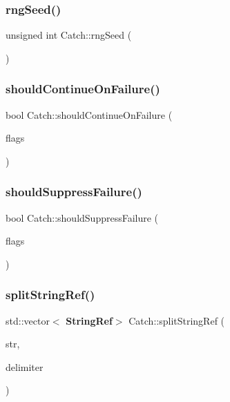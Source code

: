 \mbox{\label{namespace_catch_acf5ea05e942d2d7fe79111e12754ed76}} 
\subsubsection{rngSeed()}
{\footnotesize\ttfamily unsigned int Catch\+::rng\+Seed (\begin{DoxyParamCaption}{ }\end{DoxyParamCaption})}

\mbox{\label{namespace_catch_a7f7480b15d74965459c844f0d393ed87}} 
\subsubsection{shouldContinueOnFailure()}
{\footnotesize\ttfamily bool Catch\+::should\+Continue\+On\+Failure (\begin{DoxyParamCaption}\item[{int}]{flags }\end{DoxyParamCaption})}

\mbox{\label{namespace_catch_ab91eb13081203d634fe48d3d2ab386d7}} 
\subsubsection{shouldSuppressFailure()}
{\footnotesize\ttfamily bool Catch\+::should\+Suppress\+Failure (\begin{DoxyParamCaption}\item[{int}]{flags }\end{DoxyParamCaption})}

\mbox{\label{namespace_catch_a35ef4c6329ab86a47243c25a58274109}} 
\subsubsection{splitStringRef()}
{\footnotesize\ttfamily std\+::vector$<$\textbf{ String\+Ref}$>$ Catch\+::split\+String\+Ref (\begin{DoxyParamCaption}\item[{\textbf{ String\+Ref}}]{str,  }\item[{char}]{delimiter }\end{DoxyParamCaption})}

